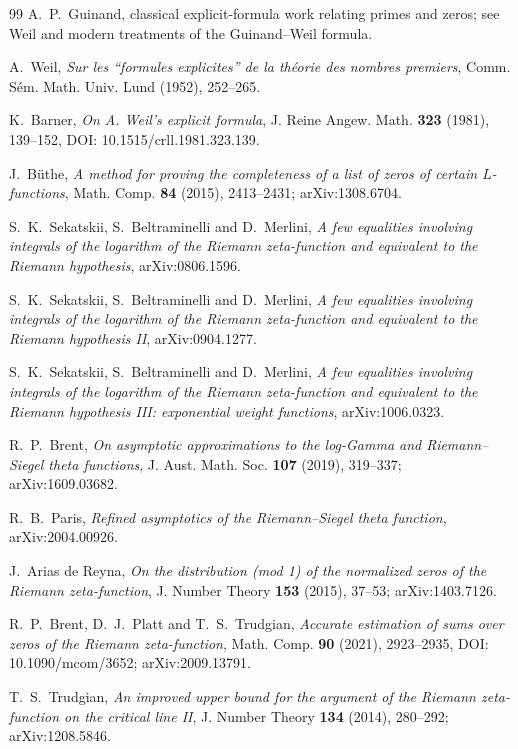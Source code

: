 \documentclass[11pt]{amsart}
\numberwithin{equation}{section}
\theoremstyle{definition}
\theoremstyle{remark}
\begin{document}
\begin{thebibliography}{99}
A.~P.~Guinand,
classical explicit-formula work relating primes and zeros;
see Weil and modern treatments of the Guinand--Weil formula.

A.~Weil,
\emph{Sur les ``formules explicites'' de la théorie des nombres premiers},
Comm. Sém. Math. Univ. Lund (1952), 252--265.

K.~Barner,
\emph{On A. Weil's explicit formula},
J. Reine Angew. Math. \textbf{323} (1981), 139--152,
DOI: 10.1515/crll.1981.323.139.

J.~Büthe,
\emph{A method for proving the completeness of a list of zeros of certain $L$-functions},
Math. Comp. \textbf{84} (2015), 2413--2431; arXiv:1308.6704.

S.~K.~Sekatskii, S.~Beltraminelli and D.~Merlini,
\emph{A few equalities involving integrals of the logarithm of the Riemann zeta-function and equivalent to the Riemann hypothesis},
arXiv:0806.1596.

S.~K.~Sekatskii, S.~Beltraminelli and D.~Merlini,
\emph{A few equalities involving integrals of the logarithm of the Riemann zeta-function and equivalent to the Riemann hypothesis II},
arXiv:0904.1277.

S.~K.~Sekatskii, S.~Beltraminelli and D.~Merlini,
\emph{A few equalities involving integrals of the logarithm of the Riemann zeta-function and equivalent to the Riemann hypothesis III: exponential weight functions},
arXiv:1006.0323.

R.~P.~Brent,
\emph{On asymptotic approximations to the log-Gamma and Riemann--Siegel theta functions},
J. Aust. Math. Soc. \textbf{107} (2019), 319--337;
arXiv:1609.03682.

R.~B.~Paris,
\emph{Refined asymptotics of the Riemann--Siegel theta function},
arXiv:2004.00926.

J.~Arias de Reyna,
\emph{On the distribution (mod 1) of the normalized zeros of the Riemann zeta-function},
J. Number Theory \textbf{153} (2015), 37--53; arXiv:1403.7126.

R.~P.~Brent, D.~J.~Platt and T.~S.~Trudgian,
\emph{Accurate estimation of sums over zeros of the Riemann zeta-function},
Math. Comp. \textbf{90} (2021), 2923--2935, DOI: 10.1090/mcom/3652; arXiv:2009.13791.

T.~S.~Trudgian,
\emph{An improved upper bound for the argument of the Riemann zeta-function on the critical line II},
J. Number Theory \textbf{134} (2014), 280--292; arXiv:1208.5846.

\end{thebibliography}
\end{document}
